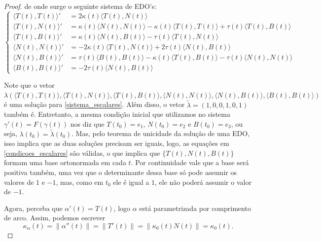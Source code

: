 \documentclass{article}
\begin{document}
\begin{proof}
    \noindent de onde surge o seguinte sistema de EDO's:
    \begin{equation}
        \left\{
            \begin{array}{rl}
                \langle T(t), T(t)\rangle' & = 2\kappa(t) \langle T(t), N(t)\rangle \\
                \langle T(t), N(t)\rangle' & = \kappa(t) \langle N(t), N(t)\rangle - \kappa(t) \langle T(t), T(t)\rangle + \tau(t) \langle T(t), B(t)\rangle \\
                \langle T(t), B(t)\rangle' & = \kappa(t) \langle N(t), B(t)\rangle - \tau(t) \langle T(t), N(t)\rangle \\
                \langle N(t), N(t)\rangle' & = - 2\kappa(t) \langle T(t), N(t)\rangle + 2\tau(t) \langle N(t), B(t)\rangle \\
                \langle N(t), B(t)\rangle' & = \tau(t) \langle B(t), B(t)\rangle - \kappa(t) \langle T(t), B(t)\rangle - \tau(t) \langle N(t), N(t)\rangle \\
                \langle B(t), B(t)\rangle' & = -2\tau(t) \langle N(t), B(t)\rangle
            \end{array}
        \right.
        \label{sistema_escalares}
    \end{equation}
    
    Note que o vetor $\lambda\left(\langle T(t), T(t)\rangle, \langle T(t), N(t)\rangle, \langle T(t), B(t)\rangle, \langle N(t), N(t)\rangle, \langle N(t), B(t)\rangle, \langle B(t), B(t)\rangle\right)$ é uma solução para \ref{sistema_escalares}. Além disso, o vetor $\tilde{\lambda} = (1, 0, 0, 1, 0, 1)$ também é. Entretanto, a mesma condição inicial que utilizamos no sistema $\gamma'(t) = F(\gamma(t))$ nos diz que $T(t_0) = e_1$, $N(t_0) = e_2$ e $B(t_0) = e_3$, ou seja, $\lambda(t_0) = \tilde{\lambda}(t_0)$. Mas, pelo teorema de unicidade da solução de uma EDO, isso implica que as duas soluções precisam ser iguais, logo, as equações em \ref{condicoes_escalares} são válidas, o que implica que $\{T(t), N(t), B(t)\}$ formam uma base ortonormada em cada $t$. Por continuidade vale que a base será positiva também, uma vez que o determinante dessa base só pode assumir os valores de $1$ e $-1$, mas, como em $t_0$ ele é igual a $1$, ele não poderá assumir o valor de $-1$.
    
    Agora, perceba que $\alpha'(t) = T(t)$, logo $\alpha$ está parametrizada por comprimento de arco. Assim, podemos escrever
    \[\kappa_\alpha(t) = \|\alpha''(t)\| = \|T'(t)\| = \|\kappa_0(t)N(t)\| = \kappa_0(t).\]
    

\end{proof}
\end{document}
